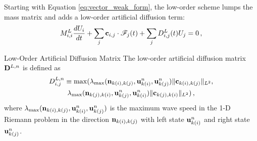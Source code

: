 Starting with Equation \eqref{eq:vector_weak_form}, the low-order scheme
lumps the mass matrix and adds a low-order artificial diffusion term:
\begin{equation}
   M^L_{i,i}\frac{dU_i}{dt}
     + \sum\limits_j\mathbf{c}_{i,j}\cdot\mathscr{F}_j(t)
     + \sum\limits_jD_{i,j}^{L}(t)U_j
     = 0 \,,
\end{equation}
\begin{definition}{Low-Order Artificial Diffusion Matrix}
   The low-order artificial diffusion matrix $\loworderdiffusionmatrix[\timeindex]$
   is defined as
   \begin{multline}\label{eq:low_order_diffusion_matrix_system}
     D_{i,j}^{L,n} \equiv
       \max(\lambda_{\text{max}}(\mathbf{n}_{k(i),k(j)},
         \mathbf{u}_{k(i)}^n,
         \mathbf{u}_{k(j)}^n)
         \|\mathbf{c}_{k(i),k(j)}\|_{L^2},\\
         \lambda_{\text{max}}(\mathbf{n}_{k(j),k(i)},
         \mathbf{u}_{k(j)}^n,
         \mathbf{u}_{k(i)}^n)
         \|\mathbf{c}_{k(j),k(i)}\|_{L^2}
       )
     \,,
   \end{multline}
  where $\lambda_{\text{max}}(\mathbf{n}_{k(i),k(j)},
         \mathbf{u}_{k(i)}^n,
         \mathbf{u}_{k(j)}^n)$
  is the maximum wave speed in the 1-D Riemann problem in the direction
  $\mathbf{n}_{k(i),k(j)}$ with left state
  $\mathbf{u}_{k(i)}^n$ and right state
  $\mathbf{u}_{k(j)}^n$.
\end{definition}
